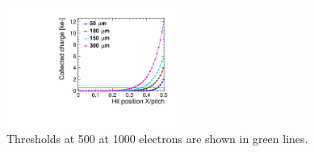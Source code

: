 \begin{figure}[htbp] 
  \centering
  \includegraphics[width=0.5\textwidth]{./figures/TestBeam/chargeSharing_theory.pdf}
  \caption{Thresholds at 500 at 1000 electrons are shown in green lines.}
  \label{fig:chargeSharing_theory}
\end{figure}





